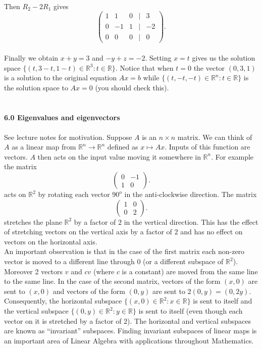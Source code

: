 \documentclass{amsart}
\begin{document}
\\
Then $R_{2}-2R_{1}$ gives
\begin{equation*}
 \begin{pmatrix}
 1&1&0&|&3\\
 0&-1&1&|&-2\\
 0&0&0&|&0
 \end{pmatrix}.
\end{equation*}
\\
Finally we obtain $x+y=3$ and $-y+z=-2$. Setting $x=t$ gives us the solution space $\{(t,3-t,1-t)\in\mathbb{R}^{3}:t\in\mathbb{R}\}$. Notice that when $t=0$ the vector $(0,3,1)$ is a solution to the original equation $Ax=b$ while $\{(t,-t,-t)\in\mathbb{R}^{n}:t\in\mathbb{R}\}$ is the solution space to $Ax=0$ (you should check this). 
\\
\\
\\
{\bf 6.0 Eigenvalues and eigenvectors}\\\\
See lecture notes for motivation. Suppose $A$ is an $n\times n$ matrix. We can think of $A$ as a linear map from $\mathbb{R}^{n}\rightarrow\mathbb{R}^{n}$ defined as $x\mapsto Ax$. 
Inputs of this function are vectors. $A$ then acts on the input value moving it somewhere in $\mathbb{R}^{n}$. For example the matrix\\
 \begin{equation*}
 \begin{pmatrix}
 0&-1\\
 1&0
 \end{pmatrix}.
\end{equation*}
acts on $\mathbb{R}^{2}$ by rotating each vector $90^{o}$ in the anti-clockwise direction. The matrix
 \begin{equation*}
 \begin{pmatrix}
1&0\\
 0&2
 \end{pmatrix}.
\end{equation*}
stretches the plane $\mathbb{R}^{2}$ by a factor of $2$ in the vertical direction. This has the effect of stretching vectors on the vertical axis by a factor of $2$ and has no effect on vectors on the horizontal axis.\\
An important observation is that in the case of the first matrix each non-zero vector is moved to a different line through $0$ (or a different subspace of $\mathbb{R}^{2}$). Moreover 2 vectors $v$ and $cv$ (where $c$ is a constant) are moved from the same line to the same line. In the case of the second matrix, vectors of the form $(x,0)$ are sent to $(x,0)$ and vectors of the form $(0,y)$ are sent to $2(0,y)=(0,2y)$. Consequently, the horizontal subspace $\{(x,0)\in\mathbb{R}^{2}:x\in\mathbb{R}\}$ is sent to itself and the vertical subspace $\{(0,y)\in\mathbb{R}^{2}:y\in\mathbb{R}\}$ is sent to itself (even though each vector on it is stretched by a factor of $2$). The horizontal and vertical subspaces are known as ``invariant'' subspaces. Finding invariant subspaces of linear maps is an important area of Linear Algebra with applications throughout Mathematics.\\
\end{document}
